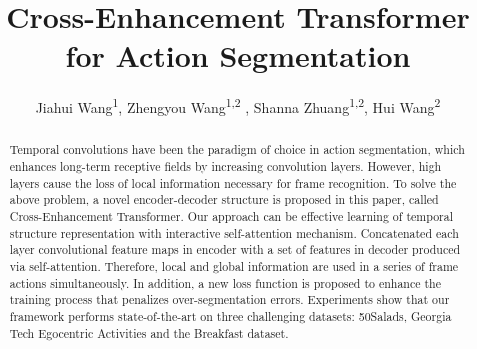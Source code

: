 \documentclass[runningheads]{llncs}
\begin{document}
\pagestyle{headings}
\mainmatter



\title{Cross-Enhancement Transformer for Action Segmentation}

\author{
    Jiahui Wang\textsuperscript{\rm 1},
    Zhengyou Wang\textsuperscript{\rm 1,2 \Letter},
    Shanna Zhuang\textsuperscript{\rm 1,2},
    Hui Wang\textsuperscript{\rm 2}
}


\newcommand{\fn}[1]{\footnotesize{#1}}
\newcommand{\green}[1]{\textcolor[RGB]{96,177,87}{#1}}
\newcommand{\gbf}[1]{\green{\bf{\fn{(#1)}}}}
\def \LN {\eta\xspace}
\def\ie{\textit{i.e.}}
\def\eg{\textit{e.g.}}
\def\etc{etc}
\def\etal{\textit{et al.}}

\newcommand{\wwh}[1]{\textcolor{blue}{[wwh: #1]}}


\begin{comment}
\titlerunning{Vision Transformer Adapter for Dense Predictions}
\authorrunning{Zhe Chen et al.}
\institute{Princeton University, Princeton NJ 08544, USA \and
Springer Heidelberg, Tiergartenstr. 17, 69121 Heidelberg, Germany
\email{lncs@springer.com}\\
\url{http://www.springer.com/gp/computer-science/lncs} \and
ABC Institute, Rupert-Karls-University Heidelberg, Heidelberg, Germany\\
\email{\{abc,lncs\}@uni-heidelberg.de}}
\end{comment}
\maketitle

\begin{abstract}
	Temporal convolutions have been the paradigm of choice in action segmentation, which enhances long-term receptive fields by increasing convolution layers. However, high layers cause the loss of local information necessary for frame recognition. To solve the above problem, a novel encoder-decoder structure is proposed in this paper, called Cross-Enhancement Transformer. Our approach can be effective learning of temporal structure representation with interactive self-attention mechanism. Concatenated each layer convolutional feature maps in encoder with a set of features in decoder produced via self-attention. Therefore, local and global information are used in a series of frame actions simultaneously. In addition, a new loss function is proposed to enhance the training process that penalizes over-segmentation errors. Experiments show that our framework performs state-of-the-art on three challenging datasets: 50Salads, Georgia Tech Egocentric Activities and the Breakfast dataset.
\end{abstract}
\end{document}
